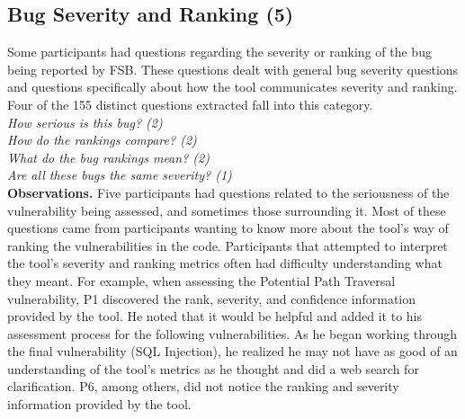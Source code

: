 \documentclass[conference]{IEEEtran}
\begin{document}




\noindent\subsection{\textbf{Bug Severity and Ranking (5)}}\label{bsr}

Some participants had questions regarding the severity or ranking of the bug being reported by FSB. 
These questions dealt with general bug severity questions and questions specifically about how the tool communicates severity and ranking. 
Four of the 155 distinct questions extracted fall into this category. 
\\

\noindent\emph{How serious is this bug? (2)} \\
\emph{How do the rankings compare? (2)} \\
\emph{What do the bug rankings mean? (2)} \\
\emph{Are all these bugs the same severity? (1)} \\

\noindent\textbf{Observations.}
Five participants had questions related to the seriousness of the vulnerability being assessed, and sometimes those surrounding it. 
Most of these questions came from participants wanting to know more about the tool's way of ranking the vulnerabilities in the code.
Participants that attempted to interpret the tool's severity and ranking metrics often had difficulty understanding what they meant. 
For example, when assessing the Potential Path Traversal vulnerability, P1 discovered the rank, severity, and confidence information provided by the tool. 
He noted that it would be helpful and added it to his assessment process for the following vulnerabilities.
As he began working through the final vulnerability (SQL Injection), he realized he may not have as good of an understanding of the tool's metrics as he thought and did a web search for clarification. 
P6, among others, did not notice the ranking and severity information provided by the tool. 
\\
\end{document}
